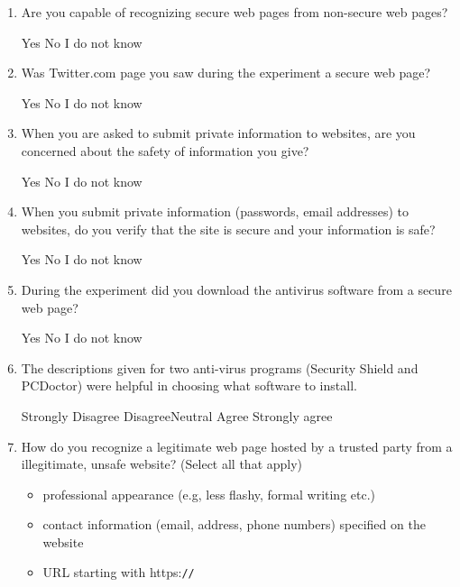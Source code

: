 \documentclass[doctor]{thesis} %
\theoremstyle{plain}
\begin{document}
\begin{enumerate}[noitemsep]
\item Are you capable of recognizing secure web pages from non-secure web pages?
\par Yes \hspace{1cm} No \hspace{1cm} I do not know
\item Was Twitter.com page you saw during the experiment a secure web page?
\par Yes \hspace{1cm} No \hspace{1cm} I do not know
\item When you are asked to submit private information to websites, are you concerned about the safety of information you give?
\par Yes \hspace{1cm} No \hspace{1cm} I do not know
\item  When you submit private information (passwords, email addresses) to websites, do you verify that the site is secure and your information is safe?
\par Yes \hspace{1cm} No \hspace{1cm} I do not know
\item During the experiment did you download the antivirus software from a secure web page?
\par Yes \hspace{1cm} No \hspace{1cm} I do not know
\item The descriptions given for two anti-virus programs (Security Shield and PCDoctor) were helpful in choosing what software to install.
\par Strongly Disagree \hspace{1cm} Disagree\hspace{1cm}Neutral\hspace{1cm} Agree\hspace{1cm} Strongly agree
\item How do you recognize a legitimate web page hosted by a trusted party from a illegitimate,
unsafe website? (Select all that apply)
\begin{itemize}[topsep=-6em, label={o}]
\itemsep-1em 
\item professional appearance (e.g, less flashy, formal writing etc.)
\item contact information (email, address, phone numbers) specified on the website
\item URL starting with https:\verb|//|

\end{itemize}
\end{enumerate}
\end{document}
